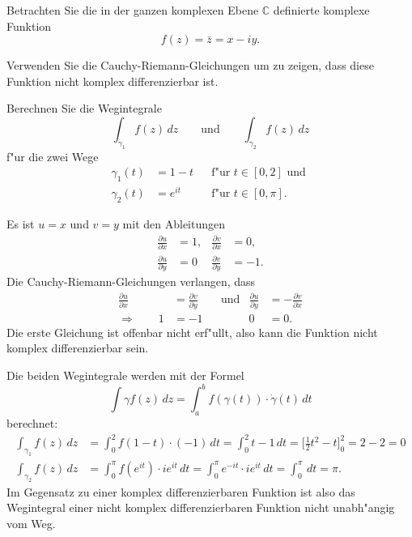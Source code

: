 Betrachten Sie die in der ganzen komplexen Ebene $\mathbb C$ definierte
komplexe Funktion
\[
f(z)=\bar z=x-iy.
\]
\begin{teilaufgaben}
\item
Verwenden Sie die Cauchy-Riemann-Gleichungen um zu zeigen, dass diese
Funktion nicht komplex differenzierbar ist.
\item
Berechnen Sie die Wegintegrale
\[
\int_{\gamma_1}f(z)\,dz
\qquad\text{und}\qquad
\int_{\gamma_2}f(z)\,dz
\]
f"ur die zwei Wege
\[
\begin{aligned}
\gamma_1(t)&=1-t    &&\text{f"ur $t\in[0,2]$ und }\\
\gamma_2(t)&=e^{it} &&\text{f"ur $t\in[0,\pi]$.}
\end{aligned}
\]
\end{teilaufgaben}

\begin{loesung}
\begin{teilaufgaben}
\item
Es ist $u=x$ und $v=y$ mit den Ableitungen
\[
\begin{aligned}
\frac{\partial u}{\partial x}&=1,&
\frac{\partial v}{\partial x}&=0,\\
\frac{\partial u}{\partial y}&=0&
\frac{\partial v}{\partial y}&=-1.
\end{aligned}
\]
Die Cauchy-Riemann-Gleichungen verlangen, dass
\[
\begin{aligned}
\frac{\partial u}{\partial x}&=\frac{\partial v}{\partial y}
&&\text{und}&
\frac{\partial u}{\partial y}&=-\frac{\partial v}{\partial x}
\\
\Rightarrow\qquad
1&=-1&&&0&=0.
\end{aligned}
\]
Die erste Gleichung ist offenbar nicht erf"ullt, also kann die Funktion
nicht komplex differenzierbar sein.
\item
Die beiden Wegintegrale werden mit der Formel
\[
\int\gamma f(z)\,dz = \int_a^b f(\gamma(t))\cdot \dot\gamma(t)\,dt
\]
berechnet:
\begin{align*}
\int_{\gamma_1}f(z) \,dz
&=
\int_0^2 f(1-t)\cdot (-1)\,dt
=
\int_0^2 t-1\,dt
=
\biggl[\frac12t^2-t\biggl]_0^2
=
2-2=0
\\
\int_{\gamma_2}f(z) \,dz
&=
\int_0^\pi f(e^{it})\cdot ie^{it}\,dt
=
\int_0^\pi e^{-it}\cdot ie^{it}\,dt
=
\int_0^\pi \,dt
=
\pi.
\end{align*}
Im Gegensatz zu einer komplex differenzierbaren Funktion ist also das
Wegintegral einer nicht komplex differenzierbaren Funktion nicht
unabh"angig vom Weg.
\qedhere
\end{teilaufgaben}
\end{loesung}

